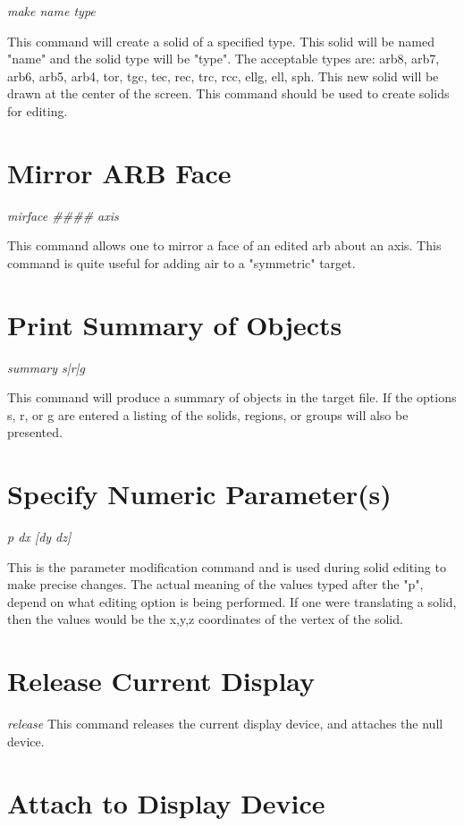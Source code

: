 {\em \center
make name type
}

This command will create a solid of a specified type.
This solid will be named "name" and the solid type will be "type".
The acceptable types are: arb8, arb7, arb6, arb5, arb4, tor, tgc, tec,
rec, trc, rcc, ellg, ell, sph.
This new solid will be drawn at the center of the screen.
This command should be used to create
solids for editing.

\section{Mirror ARB Face}

{\em \center
mirface \#\#\#\# axis
}

This command allows one to mirror a face of an edited arb about an axis.
This command is quite useful for adding air to a "symmetric" target.

\section{Print Summary of Objects}

{\em \center
summary s|r|g
}

This command will produce a summary of objects in the target file.
If the options s, r, or g are entered a listing of the solids, regions,
or groups will also be presented.

\section{Specify Numeric Parameter(s)}

{\em \center
p dx [dy dz]
}

This is the parameter modification command and is used during solid
editing to make precise changes.
The actual meaning of the values typed after the "p", depend on what
editing option is being performed.
If one were translating a solid, then the values would be the x,y,z
coordinates of the vertex of the solid.

\section{Release Current Display}

{\em \center
release
}
This command releases the current display device,
and attaches the null device.

\section{Attach to Display Device}

